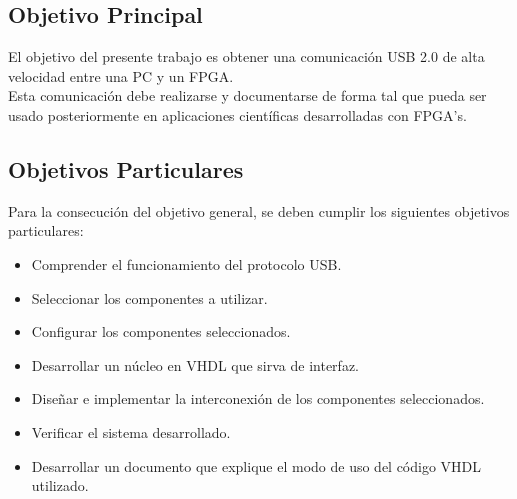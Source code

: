 \subsection{Objetivo Principal}
	El objetivo del presente trabajo es obtener una comunicación USB 2.0 de alta velocidad entre una PC y un FPGA.\\
	
	Esta comunicación debe realizarse y documentarse de forma tal que pueda ser usado posteriormente en aplicaciones científicas desarrolladas con FPGA's.\\
	
\subsection{Objetivos Particulares}
	Para la consecución del objetivo general, se deben cumplir los siguientes objetivos particulares:
	
	\begin{itemize}
		\item Comprender el funcionamiento del protocolo USB.
		\item Seleccionar los componentes a utilizar.
		\item Configurar los componentes seleccionados.
		\item Desarrollar un núcleo en VHDL que sirva de interfaz.
		\item Diseñar e implementar la interconexión de los componentes seleccionados.
		\item Verificar el sistema desarrollado.
		\item Desarrollar un documento que explique el modo de uso del código VHDL utilizado.
	\end{itemize}